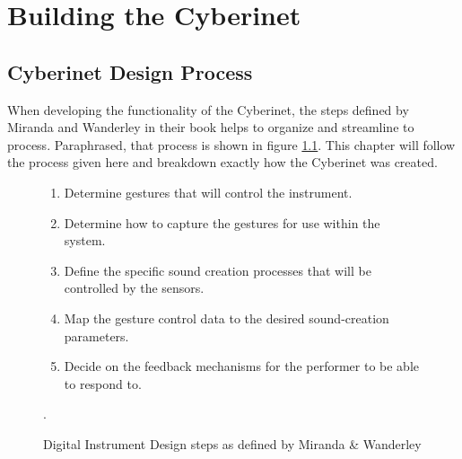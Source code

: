 \chapter{Building the Cyberinet}







\section{Cyberinet Design Process}


When developing the functionality of the Cyberinet, the steps defined by Miranda and Wanderley in their book\cite{miranda_Wanderley_instrumentControl_2006} helps to organize and streamline to process. Paraphrased, that process is shown in figure \ref{fig:DMIProcess}. This chapter will follow the process given here and breakdown exactly how the Cyberinet was created.

\begin{figure}
    \centering
    \begin{enumerate}
    \item Determine gestures that will control the instrument.
    \item Determine how to capture the gestures for use within the system.
    \item Define the specific sound creation processes that will be controlled by the sensors.
    \item Map the gesture control data to the desired sound-creation parameters.
    \item Decide on the feedback mechanisms for the performer to be able to respond to.
\end{enumerate}
    \caption{Digital Instrument Design steps as defined by Miranda \& Wanderley\cite{miranda_Wanderley_instrumentControl_2006}}.
    \label{fig:DMIProcess}
\end{figure}

